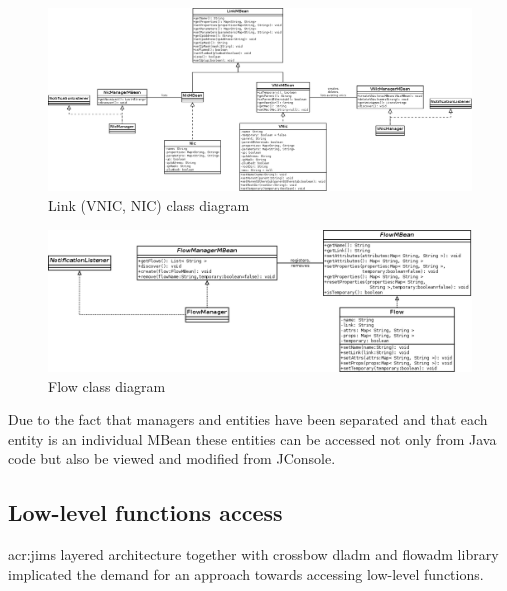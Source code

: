 \documentclass[11pt,openany]{book}
\begin{document}
        \begin{figure}[H]
          \centering
          \includegraphics[width=1.2\textwidth, angle=90]{img/impl/link.png}

          \caption{Link (VNIC, NIC) class diagram}
          \label{fig:impl:vnic}
        \end{figure}

        \begin{figure}[H]
          \centering
          \includegraphics[width=1.2\textwidth, angle=90]{img/impl/flow.png}

          \caption{Flow class diagram}
          \label{fig:impl:flow}
        \end{figure}

        Due to the fact that managers and entities have been separated and that each entity is an individual MBean
        these entities can be accessed not only from Java code but also be viewed and modified from JConsole.


      \subsection{Low-level functions access}
      \label{sec:impl:low}

        \gls{acr:jims} layered architecture together with crossbow dladm and flowadm library implicated the demand for 
        an approach towards accessing low-level functions.
\end{document}
